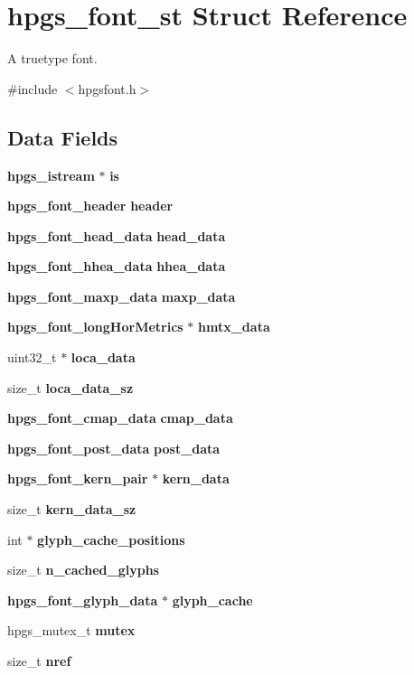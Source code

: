 \section{hpgs\_\-font\_\-st Struct Reference}
\label{structhpgs__font__st}


A truetype font.  




{\ttfamily \#include $<$hpgsfont.h$>$}

\subsection*{Data Fields}
\begin{DoxyCompactItemize}
\item 
{\bf hpgs\_\-istream} $\ast$ {\bf is}
\item 
{\bf hpgs\_\-font\_\-header} {\bfseries header}\label{structhpgs__font__st_aa73c2cf94596cd81d8eba9e8dcbf56db}

\item 
{\bf hpgs\_\-font\_\-head\_\-data} {\bf head\_\-data}
\item 
{\bf hpgs\_\-font\_\-hhea\_\-data} {\bf hhea\_\-data}
\item 
{\bf hpgs\_\-font\_\-maxp\_\-data} {\bf maxp\_\-data}
\item 
{\bf hpgs\_\-font\_\-longHorMetrics} $\ast$ {\bf hmtx\_\-data}
\item 
uint32\_\-t $\ast$ {\bf loca\_\-data}
\item 
size\_\-t {\bf loca\_\-data\_\-sz}
\item 
{\bf hpgs\_\-font\_\-cmap\_\-data} {\bf cmap\_\-data}
\item 
{\bf hpgs\_\-font\_\-post\_\-data} {\bf post\_\-data}
\item 
{\bf hpgs\_\-font\_\-kern\_\-pair} $\ast$ {\bfseries kern\_\-data}\label{structhpgs__font__st_a252e4f0f49ac6a3f9fabf36456c68c6f}

\item 
size\_\-t {\bf kern\_\-data\_\-sz}
\item 
int $\ast$ {\bf glyph\_\-cache\_\-positions}
\item 
size\_\-t {\bf n\_\-cached\_\-glyphs}
\item 
{\bf hpgs\_\-font\_\-glyph\_\-data} $\ast$ {\bf glyph\_\-cache}
\item 
hpgs\_\-mutex\_\-t {\bf mutex}
\item 
size\_\-t {\bf nref}
\end{DoxyCompactItemize}


